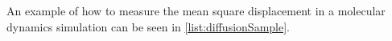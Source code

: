An example of how to measure the mean square displacement in a molecular dynamics simulation can be seen in \cref{list:diffusionSample}.
% 
